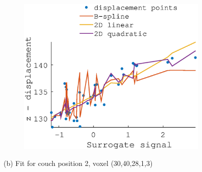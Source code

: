 \documentclass[11pt,a4paper,oneside]{report}
\begin{document}
\begin{figure}
\begin{subfigure}[b]{0.33\textwidth}
  \end{subfigure}
    ~ %
  \begin{subfigure}[b]{0.33\textwidth}
    \includegraphics[width=\textwidth, trim=0 0 0 110,clip=true]{figures/task2/fit_round3_couch2.eps}
  \end{subfigure}
  (b) Fit for couch position 2, voxel (30,40,28,1,3)
  \vspace*{1em}
  

\end{figure}
\end{document}
